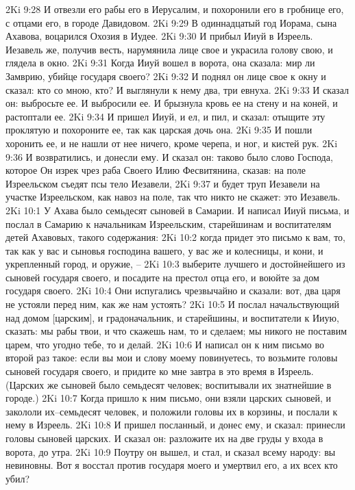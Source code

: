 2Ki 9:28  И отвезли его рабы его в Иерусалим, и похоронили его в гробнице его, с отцами его, в городе Давидовом.
2Ki 9:29  В одиннадцатый год Иорама, сына Ахавова, воцарился Охозия в Иудее.
2Ki 9:30  И прибыл Ииуй в Изреель. Иезавель же, получив весть, нарумянила лице свое и украсила голову свою, и глядела в окно.
2Ki 9:31  Когда Ииуй вошел в ворота, она сказала: мир ли Замврию, убийце государя своего?
2Ki 9:32  И поднял он лице свое к окну и сказал: кто со мною, кто? И выглянули к нему два, три евнуха.
2Ki 9:33  И сказал он: выбросьте ее. И выбросили ее. И брызнула кровь ее на стену и на коней, и растоптали ее.
2Ki 9:34  И пришел Ииуй, и ел, и пил, и сказал: отыщите эту проклятую и похороните ее, так как царская дочь она.
2Ki 9:35  И пошли хоронить ее, и не нашли от нее ничего, кроме черепа, и ног, и кистей рук.
2Ki 9:36  И возвратились, и донесли ему. И сказал он: таково было слово Господа, которое Он изрек чрез раба Своего Илию Фесвитянина, сказав: на поле Изреельском съедят псы тело Иезавели,
2Ki 9:37  и будет труп Иезавели на участке Изреельском, как навоз на поле, так что никто не скажет: это Иезавель.
2Ki 10:1  У Ахава было семьдесят сыновей в Самарии. И написал Ииуй письма, и послал в Самарию к начальникам Изреельским, старейшинам и воспитателям детей Ахавовых, такого содержания:
2Ki 10:2  когда придет это письмо к вам, то, так как у вас и сыновья господина вашего, у вас же и колесницы, и кони, и укрепленный город, и оружие, --
2Ki 10:3  выберите лучшего и достойнейшего из сыновей государя своего, и посадите на престол отца его, и воюйте за дом государя своего.
2Ki 10:4  Они испугались чрезвычайно и сказали: вот, два царя не устояли перед ним, как же нам устоять?
2Ki 10:5  И послал начальствующий над домом [царским], и градоначальник, и старейшины, и воспитатели к Ииую, сказать: мы рабы твои, и что скажешь нам, то и сделаем; мы никого не поставим царем, что угодно тебе, то и делай.
2Ki 10:6  И написал он к ним письмо во второй раз такое: если вы мои и слову моему повинуетесь, то возьмите головы сыновей государя своего, и придите ко мне завтра в это время в Изреель. (Царских же сыновей было семьдесят человек; воспитывали их знатнейшие в городе.)
2Ki 10:7  Когда пришло к ним письмо, они взяли царских сыновей, и закололи их--семьдесят человек, и положили головы их в корзины, и послали к нему в Изреель.
2Ki 10:8  И пришел посланный, и донес ему, и сказал: принесли головы сыновей царских. И сказал он: разложите их на две груды у входа в ворота, до утра.
2Ki 10:9  Поутру он вышел, и стал, и сказал всему народу: вы невиновны. Вот я восстал против государя моего и умертвил его, а их всех кто убил?
